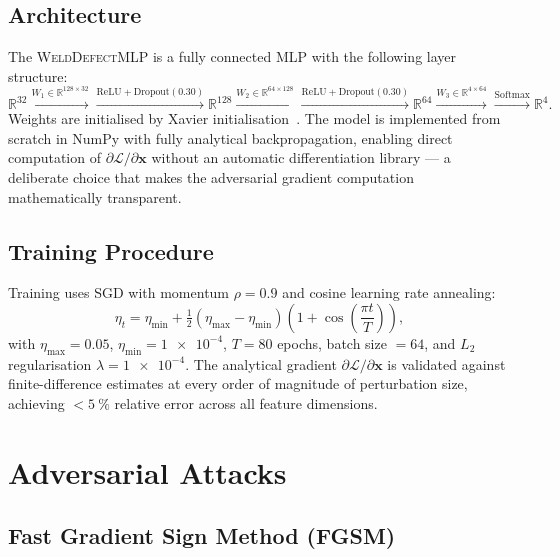 \subsection{Architecture}
\label{subsec:adv_architecture}

The \textsc{WeldDefectMLP} is a fully connected \ac{MLP} with the
following layer structure:
\begin{equation}
  \mathbb{R}^{32}
  \xrightarrow{W_1 \in \mathbb{R}^{128 \times 32}}
  \xrightarrow{\mathrm{ReLU}+\mathrm{Dropout}(0.30)}
  \mathbb{R}^{128}
  \xrightarrow{W_2 \in \mathbb{R}^{64 \times 128}}
  \xrightarrow{\mathrm{ReLU}+\mathrm{Dropout}(0.30)}
  \mathbb{R}^{64}
  \xrightarrow{W_3 \in \mathbb{R}^{4 \times 64}}
  \xrightarrow{\mathrm{Softmax}}
  \mathbb{R}^{4}.
  \label{eq:mlp_arch}
\end{equation}
Weights are initialised by Xavier initialisation~\cite{Goodfellow2016}.
The model is implemented from scratch in NumPy with fully analytical
backpropagation, enabling direct computation of $\partial \mathcal{L} /
\partial \bm{x}$ without an automatic differentiation library --- a
deliberate choice that makes the adversarial gradient computation
mathematically transparent.

\subsection{Training Procedure}
\label{subsec:adv_training}

Training uses \acs{SGD} with momentum $\rho = \num{0.9}$ and cosine
learning rate annealing:
\begin{equation}
  \eta_t = \eta_\mathrm{min} + \tfrac{1}{2}(\eta_\mathrm{max} -
    \eta_\mathrm{min})\left(1 + \cos\!\left(\frac{\pi t}{T}\right)\right),
  \label{eq:cosine_lr}
\end{equation}
with $\eta_\mathrm{max} = \num{0.05}$, $\eta_\mathrm{min} = \num{1e-4}$,
$T = 80$ epochs, batch size $= 64$, and $L_2$ regularisation
$\lambda = \num{1e-4}$.  The analytical gradient $\partial \mathcal{L} /
\partial \bm{x}$ is validated against finite-difference estimates at every
order of magnitude of perturbation size, achieving $< \SI{5}{\percent}$
relative error across all feature dimensions.

\section{Adversarial Attacks}
\label{sec:adv_attacks}

\subsection{Fast Gradient Sign Method (FGSM)}
\label{subsec:adv_fgsm}

